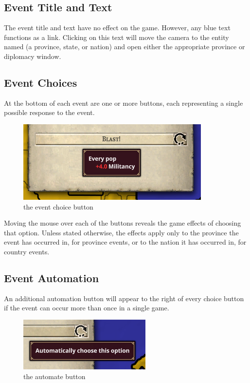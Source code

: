 \subsection{Event Title and Text}
The event title and text have no effect on the game. However, any blue text functions as a link. Clicking on this text will move the camera to the entity named (a province, state, or nation) and open either the appropriate province or diplomacy window.

\subsection{Event Choices}
At the bottom of each event are one or more buttons, each representing a single possible response to the event.

\begin{figure}[htb]
\begin{center}
	\includegraphics{province_e_button.png}
\end{center}
\caption{the event choice button}
\end{figure}

Moving the mouse over each of the buttons reveals the game effects of choosing that option. Unless stated otherwise, the effects apply only to the province the event has occurred in, for province events, or to the nation it has occurred in, for country events.

\subsection{Event Automation}
An additional automation button will appear to the right of every choice button if the event can occur more than once in a single game.

\begin{figure}[htb]
\begin{center}
	\includegraphics{province_e_automate.png}
\end{center}
\caption{the automate button}
\end{figure}

